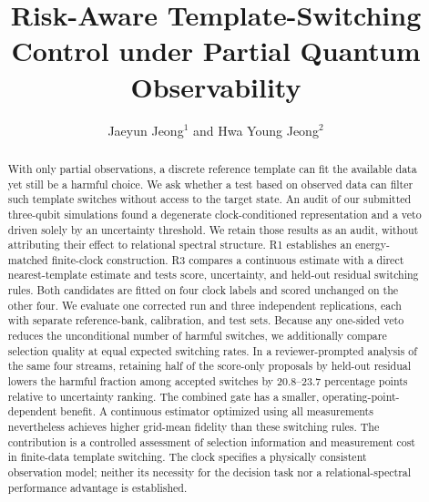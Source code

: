 \documentclass{iopjournal}
\begin{document}

\title{Risk-Aware Template-Switching Control under Partial Quantum Observability}

\author{Jaeyun Jeong$^1$ and Hwa Young Jeong$^2$}





\begin{abstract}
With only partial observations, a discrete reference template can fit the
available data yet still be a harmful choice.  We ask whether a test based on
observed data can filter such template switches without access to the target
state.  An audit of our submitted three-qubit simulations found a degenerate
clock-conditioned representation and a veto driven solely by an uncertainty
threshold.  We retain those results as an audit, without attributing their
effect to relational spectral structure.  R1 establishes an energy-matched
finite-clock construction.  R3 compares a continuous estimate with a direct
nearest-template estimate and tests score, uncertainty, and held-out residual
switching rules.  Both candidates are fitted on four clock labels and scored
unchanged on the other four.  We evaluate one corrected run and three independent
replications, each with separate reference-bank, calibration, and test sets.
Because any one-sided veto reduces the unconditional number of harmful
switches, we additionally compare selection quality at equal expected
switching rates.  In a reviewer-prompted analysis of the same four streams,
retaining half of the score-only proposals by held-out residual lowers the
harmful fraction among accepted switches by 20.8--23.7 percentage points
relative to uncertainty ranking.  The combined gate has a smaller,
operating-point-dependent benefit.  A continuous estimator optimized using
all measurements nevertheless achieves higher grid-mean fidelity than these
switching rules.  The contribution is a controlled assessment of selection
information and measurement cost in finite-data template switching.  The clock
specifies a physically consistent observation model; neither its necessity for
the decision task nor a relational-spectral performance advantage is established.
\end{abstract}
\end{document}
